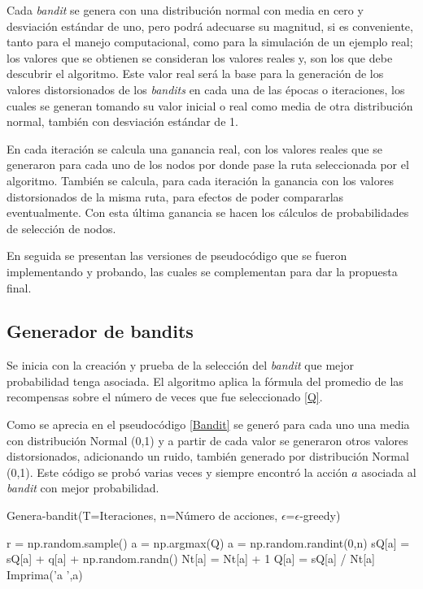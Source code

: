 Cada \textit{bandit} se genera con una distribución normal con media en cero y desviación estándar de uno, pero podrá adecuarse su magnitud, si es conveniente, tanto para el manejo computacional, como para la simulación de un ejemplo real; los valores que se obtienen se consideran los valores reales y, son los que debe descubrir el algoritmo. Este valor real será la base para la generación de los valores distorsionados de los \textit{bandits} en cada una de las épocas o iteraciones, los cuales se generan tomando su valor inicial o real como media de otra distribución normal, también con desviación estándar de 1.

En cada iteración se calcula una ganancia real, con los valores reales que se generaron para cada uno de los nodos por donde pase la ruta seleccionada por el algoritmo. También se calcula, para cada iteración la ganancia con los valores distorsionados de la misma ruta, para efectos de poder compararlas eventualmente. Con esta última ganancia se hacen los cálculos de probabilidades de selección de nodos.


En seguida se presentan las versiones de pseudocódigo que se fueron implementando y probando, las cuales se complementan para dar la propuesta final.

\subsection{Generador de bandits}

Se inicia con la creación y prueba de la selección del \textit{bandit} que mejor probabilidad tenga asociada. El algoritmo aplica la fórmula del  promedio de las recompensas sobre el número de veces que fue seleccionado \ref{Q}.

Como se aprecia en el pseudocódigo \ref{Bandit} se generó para cada  uno una media con distribución Normal (0,1) y a partir de cada valor se generaron otros valores distorsionados, adicionando un ruido, también generado por distribución Normal (0,1). Este código se probó varias veces y siempre encontró la acción $a$ asociada al \textit{bandit} con mejor probabilidad.



\begin{algorithm} [h]
\caption{Genera-bandit(T=Iteraciones, n=Número de acciones,
$\epsilon$=$\epsilon$-greedy)} 
\label{Bandit}
\begin{algorithmic}[1]
     \STATE r = np.random.sample()
        \STATE  a = np.argmax(Q)
     \ELSE
        \STATE a = np.random.randint(0,n)
     \ENDIF
     \STATE sQ[a] = sQ[a] + q[a] + np.random.randn()
     \STATE Nt[a] =  Nt[a] + 1
     \STATE Q[a] = sQ[a] / Nt[a]
     \STATE Imprima('a ',a)
\ENDFOR
\end{algorithmic}
\end{algorithm}

